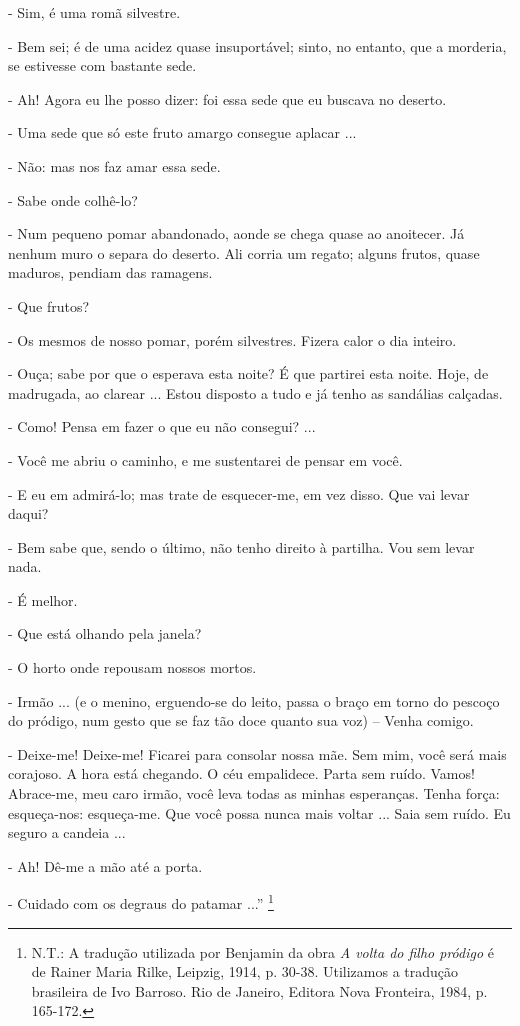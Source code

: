 - Sim, é uma romã silvestre.

- Bem sei; é de uma acidez quase insuportável; sinto, no entanto, que a
morderia, se estivesse com bastante sede.

- Ah! Agora eu lhe posso dizer: foi essa sede que eu buscava no deserto.

- Uma sede que só este fruto amargo consegue aplacar ...

- Não: mas nos faz amar essa sede.

- Sabe onde colhê-lo?

- Num pequeno pomar abandonado, aonde se chega quase ao anoitecer. Já
nenhum muro o separa do deserto. Ali corria um regato; alguns frutos,
quase maduros, pendiam das ramagens.

- Que frutos?

- Os mesmos de nosso pomar, porém silvestres. Fizera calor o dia
inteiro.

- Ouça; sabe por que o esperava esta noite? É que partirei esta noite.
Hoje, de madrugada, ao clarear ... Estou disposto a tudo e já tenho as
sandálias calçadas.

- Como! Pensa em fazer o que eu não consegui? ...

- Você me abriu o caminho, e me sustentarei de pensar em você.

- E eu em admirá-lo; mas trate de esquecer-me, em vez disso. Que vai
levar daqui?

- Bem sabe que, sendo o último, não tenho direito à partilha. Vou sem
levar nada.

- É melhor.

- Que está olhando pela janela?

- O horto onde repousam nossos mortos.

- Irmão ... (e o menino, erguendo-se do leito, passa o braço em torno do
pescoço do pródigo, num gesto que se faz tão doce quanto sua voz) --
Venha comigo.

- Deixe-me! Deixe-me! Ficarei para consolar nossa mãe. Sem mim, você
será mais corajoso. A hora está chegando. O céu empalidece. Parta sem
ruído. Vamos! Abrace-me, meu caro irmão, você leva todas as minhas
esperanças. Tenha força: esqueça-nos: esqueça-me. Que você possa nunca
mais voltar ... Saia sem ruído. Eu seguro a candeia ...

- Ah! Dê-me a mão até a porta.

- Cuidado com os degraus do patamar ...'' \footnote{N.T.: A tradução
  utilizada por Benjamin da obra \emph{A volta do filho pródigo} é de
  Rainer Maria Rilke, Leipzig, 1914, p. 30-38. Utilizamos a tradução
  brasileira de Ivo Barroso. Rio de Janeiro, Editora Nova Fronteira,
  1984, p. 165-172.}

